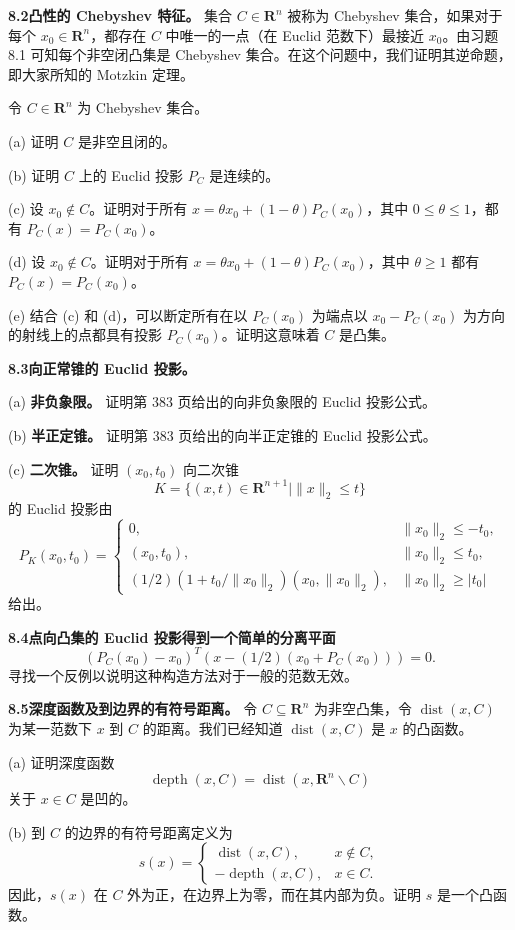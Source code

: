 \documentclass[UTF8, 12pt, fontset=fandol, oneside]{ctexart}
\begin{document}
\noindent\textbf{8.2 凸性的 Chebyshev 特征。}
集合 $C\in\mathbf{R}^n$ 被称为 Chebyshev 集合，如果对于每个 $x_0\in\mathbf{R}^n$，都存在 $C$ 中唯一的一点（在 Euclid 范数下）最接近 $x_0$。由习题 8.1 可知每个非空闭凸集是 Chebyshev 集合。在这个问题中，我们证明其逆命题，即大家所知的 Motzkin 定理。

令 $C\in\mathbf{R}^n$ 为 Chebyshev 集合。

(a) 证明 $C$ 是非空且闭的。

(b) 证明 $C$ 上的 Euclid 投影 $P_C$ 是连续的。

(c) 设 $x_0\notin C$。证明对于所有 $x=\theta x_0+(1-\theta)P_C(x_0)$，其中 $0\leq\theta\leq 1$，都有 $P_C(x)=P_C(x_0)$。

(d) 设 $x_0\notin C$。证明对于所有 $x=\theta x_0+(1-\theta)P_C(x_0)$，其中 $\theta\geq 1$ 都有 $P_C(x)=P_C(x_0)$。

(e) 结合 (c) 和 (d)，可以断定所有在以 $P_C(x_0)$ 为端点以 $x_0-P_C(x_0)$ 为方向的射线上的点都具有投影 $P_C(x_0)$。证明这意味着 $C$ 是凸集。

\noindent\textbf{8.3\quad 向正常锥的 Euclid 投影。}

(a) \textbf{非负象限。} 证明第 383 页给出的向非负象限的 Euclid 投影公式。

(b) \textbf{半正定锥。} 证明第 383 页给出的向半正定锥的 Euclid 投影公式。

(c) \textbf{二次锥。} 证明 $(x_0,t_0)$ 向二次锥
\[
K=\{(x,t)\in\mathbf{R}^{n+1}\mid \|x\|_2\leq t\}
\]
的 Euclid 投影由
\[
P_K(x_0,t_0)=
\begin{cases}
0, & \|x_0\|_2\leq -t_0,\\
(x_0,t_0), & \|x_0\|_2\leq t_0,\\
(1/2)(1+t_0/\|x_0\|_2)(x_0,\|x_0\|_2), & \|x_0\|_2\geq |t_0|
\end{cases}
\]
给出。

\noindent\textbf{8.4\quad 点向凸集的 Euclid 投影得到一个简单的分离平面}
\[
\left(P_C(x_0)-x_0\right)^T\left(x-(1/2)(x_0+P_C(x_0))\right)=0.
\]
寻找一个反例以说明这种构造方法对于一般的范数无效。

\noindent\textbf{8.5\quad [HUL93, 第 1 卷，第 154 页] 深度函数及到边界的有符号距离。}
令 $C\subseteq\mathbf{R}^n$ 为非空凸集，令 $\operatorname{dist}(x,C)$ 为某一范数下 $x$ 到 $C$ 的距离。我们已经知道 $\operatorname{dist}(x,C)$ 是 $x$ 的凸函数。

(a) 证明深度函数
\[
\operatorname{depth}(x,C)=\operatorname{dist}(x,\mathbf{R}^n\backslash C)
\]
关于 $x\in C$ 是凹的。

(b) 到 $C$ 的边界的有符号距离定义为
\[
s(x)=
\begin{cases}
\operatorname{dist}(x,C), & x\notin C,\\
-\operatorname{depth}(x,C), & x\in C.
\end{cases}
\]
因此，$s(x)$ 在 $C$ 外为正，在边界上为零，而在其内部为负。证明 $s$ 是一个凸函数。
\end{document}
